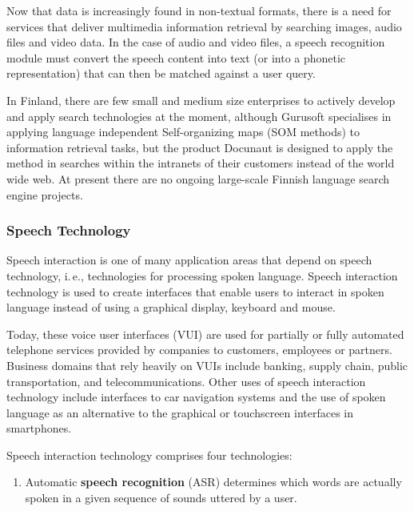 \begin{multicols}{2}
Now that data is increasingly found in non-textual formats, there is a need for services that deliver multimedia information retrieval by searching images, audio files and video data. In the case of audio and video files, a speech recognition module must convert the speech content into text (or into a phonetic representation) that can then be matched against a user query.

In Finland, there are few small and medium size enterprises to actively develop and apply search technologies at the moment, although Gurusoft specialises in applying language independent Self-organizing maps (SOM methods) to information retrieval tasks, but the product Docunaut is designed to apply the method in searches within the intranets of their customers instead of the world wide web. At present there are no ongoing large-scale Finnish language search engine projects.

\subsubsection{Speech Technology}

Speech interaction is one of many application areas that depend on speech technology, i.\,e., technologies for processing spoken language. Speech interaction technology is used to create interfaces that enable users to interact in spoken language instead of using a graphical display, keyboard and mouse.


Today, these voice user interfaces (VUI) are used for partially or fully automated telephone services provided by companies to customers, employees or partners. Business domains that rely heavily on VUIs include banking, supply chain, public transportation, and telecommunications. Other uses of speech interaction technology include interfaces to car navigation systems and the use of spoken language as an alternative to the graphical or touchscreen interfaces in smartphones.  

Speech interaction technology comprises four technologies:

\begin{enumerate}
\item Automatic \textbf{speech recognition} (ASR) determines which words are actually
    spoken in a given sequence of sounds uttered by a user.


\end{enumerate}
\end{multicols}
